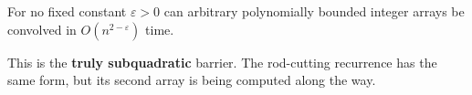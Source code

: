 \documentclass[11  pt]{article}
\begin{document}
\begin{conjecture}
For no fixed constant $\varepsilon>0$ can arbitrary polynomially bounded
integer arrays be convolved in $O(n^{2-\varepsilon})$ time.
\end{conjecture}
This is the \textbf{truly subquadratic} barrier. The rod-cutting recurrence
has the same form, but its second array is being computed along the way.

%
%
%
\end{document}
